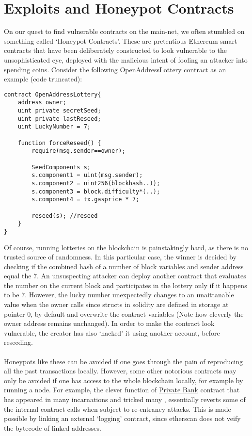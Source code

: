 \section{Exploits and Honeypot Contracts}
On our quest to find vulnerable contracts on the main-net, we often stumbled on something called `Honeypot Contracts'. These are pretentious Ethereum smart contracts that have been deliberately constructed to look vulnerable to the unsophisticated eye, deployed with the malicious intent of fooling an attacker into spending coins. Consider the following \href{https://etherscan.io/address/0x741f1923974464efd0aa70e77800ba5d9ed18902#code}{OpenAddressLottery} contract as an example (code truncated):
\begin{lstlisting}[basicstyle=\small]
contract OpenAddressLottery{
    address owner; 
    uint private secretSeed; 
    uint private lastReseed;
    uint LuckyNumber = 7;
    
    function forceReseed() {
        require(msg.sender==owner);
        
        SeedComponents s;
        s.component1 = uint(msg.sender);
        s.component2 = uint256(blockhash..));
        s.component3 = block.difficulty*(..);
        s.component4 = tx.gasprice * 7;
        
        reseed(s); //reseed
    }
}
\end{lstlisting}
Of course, running lotteries on the blockchain is painstakingly hard, as there is no trusted source of randomness. In this particular case, the winner is decided by checking if the combined hash of a number of block variables and sender address equal the  7. An unsuspecting attacker can deploy another contract that evaluates the number on the current block and participates in the lottery only if it happens to be 7. However, the lucky number unexpectedly changes to an unaittanable value when the owner calls  since structs in solidity are defined in storage at pointer 0, by default and overwrite the contract variables (Note how cleverly the owner address remains unchanged). In order to make the contract look vulnerable, the creator has also `hacked' it using another account, before reseeding.\\
\\
Honeypots like these can be avoided if one goes through the pain of reproducing all the past transactions locally. However, some other notorious contracts may only be avoided if one has access to the whole blockchain locally, for example by running a node. For example, the clever  function of \href{https://etherscan.io/address/0x95d34980095380851902ccd9a1fb4c813c2cb639#code}{Private Bank} contract that has appeared in many incarnations and tricked many \cite{reddit}, essentially reverts some of the internal contract calls when subject to re-entrancy attacks. This is made possible by linking an external `logging' contract, since etherscan does not veify the bytecode of linked addresses.\\
